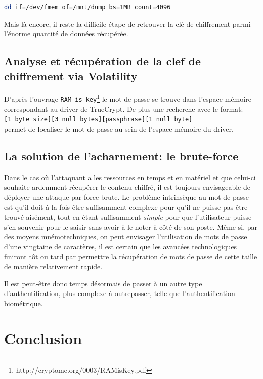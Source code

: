 \documentclass[12pt,a4paper]{article}
\begin{document}
\begin{lstlisting}[language=Bash]
dd if=/dev/fmem of=/mnt/dump bs=1MB count=4096
\end{lstlisting}

Mais là encore, il reste la difficile étape de retrouver la clé de chiffrement 
parmi l'énorme quantité de données récupérée.


\subsection{Analyse et récupération de la clef de chiffrement via Volatility}
D'après l'ouvrage \texttt{RAM is
key}\footnote{http://cryptome.org/0003/RAMisKey.pdf} le mot de passe se trouve
dans l'espace mémoire correspondant au driver de TrueCrypt. De plus une
recherche avec le format:~\\
\verb"[1 byte size][3 null bytes][passphrase][1 null byte]"\\
permet de localiser le mot de passe au sein de l'espace mémoire du driver.


\subsection{La solution de l'acharnement: le brute-force}

Dans le cas où l'attaquant a les ressources en temps et en matériel et que
celui-ci souhaite ardemment récupérer le contenu chiffré, il est toujours
envisageable de déployer une attaque par force brute. Le problème intrinsèque
au mot de passe est qu'il doit à la fois être suffisamment complexe pour qu'il
ne puisse pas être trouvé aisément, tout en étant suffisamment \textit{simple}
pour que l'utilisateur puisse s'en souvenir pour le saisir sans avoir à le
noter à côté de son poste. Même si, par des moyens mnémotechniques, on peut
envisager l'utilisation de mots de passe d'une vingtaine de caractères, il est
certain que les avancées technologiques finiront tôt ou tard par permettre la
récupération de mots de passe de cette taille de manière relativement rapide.

Il est peut-être donc temps désormais de passer à un autre type
d'authentification, plus complexe à outrepasser, telle que l'authentification
biométrique.




\section*{Conclusion}
\end{document}
